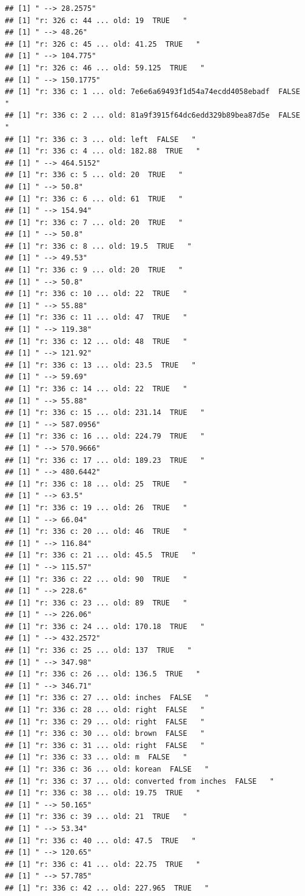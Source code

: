 \documentclass[]{article}
\begin{document}
\begin{verbatim}
## [1] " --> 28.2575"
## [1] "r: 326 c: 44 ... old: 19  TRUE   "
## [1] " --> 48.26"
## [1] "r: 326 c: 45 ... old: 41.25  TRUE   "
## [1] " --> 104.775"
## [1] "r: 326 c: 46 ... old: 59.125  TRUE   "
## [1] " --> 150.1775"
## [1] "r: 336 c: 1 ... old: 7e6e6a69493f1d54a74ecdd4058ebadf  FALSE   "
## [1] "r: 336 c: 2 ... old: 81a9f3915f64dc6edd329b89bea87d5e  FALSE   "
## [1] "r: 336 c: 3 ... old: left  FALSE   "
## [1] "r: 336 c: 4 ... old: 182.88  TRUE   "
## [1] " --> 464.5152"
## [1] "r: 336 c: 5 ... old: 20  TRUE   "
## [1] " --> 50.8"
## [1] "r: 336 c: 6 ... old: 61  TRUE   "
## [1] " --> 154.94"
## [1] "r: 336 c: 7 ... old: 20  TRUE   "
## [1] " --> 50.8"
## [1] "r: 336 c: 8 ... old: 19.5  TRUE   "
## [1] " --> 49.53"
## [1] "r: 336 c: 9 ... old: 20  TRUE   "
## [1] " --> 50.8"
## [1] "r: 336 c: 10 ... old: 22  TRUE   "
## [1] " --> 55.88"
## [1] "r: 336 c: 11 ... old: 47  TRUE   "
## [1] " --> 119.38"
## [1] "r: 336 c: 12 ... old: 48  TRUE   "
## [1] " --> 121.92"
## [1] "r: 336 c: 13 ... old: 23.5  TRUE   "
## [1] " --> 59.69"
## [1] "r: 336 c: 14 ... old: 22  TRUE   "
## [1] " --> 55.88"
## [1] "r: 336 c: 15 ... old: 231.14  TRUE   "
## [1] " --> 587.0956"
## [1] "r: 336 c: 16 ... old: 224.79  TRUE   "
## [1] " --> 570.9666"
## [1] "r: 336 c: 17 ... old: 189.23  TRUE   "
## [1] " --> 480.6442"
## [1] "r: 336 c: 18 ... old: 25  TRUE   "
## [1] " --> 63.5"
## [1] "r: 336 c: 19 ... old: 26  TRUE   "
## [1] " --> 66.04"
## [1] "r: 336 c: 20 ... old: 46  TRUE   "
## [1] " --> 116.84"
## [1] "r: 336 c: 21 ... old: 45.5  TRUE   "
## [1] " --> 115.57"
## [1] "r: 336 c: 22 ... old: 90  TRUE   "
## [1] " --> 228.6"
## [1] "r: 336 c: 23 ... old: 89  TRUE   "
## [1] " --> 226.06"
## [1] "r: 336 c: 24 ... old: 170.18  TRUE   "
## [1] " --> 432.2572"
## [1] "r: 336 c: 25 ... old: 137  TRUE   "
## [1] " --> 347.98"
## [1] "r: 336 c: 26 ... old: 136.5  TRUE   "
## [1] " --> 346.71"
## [1] "r: 336 c: 27 ... old: inches  FALSE   "
## [1] "r: 336 c: 28 ... old: right  FALSE   "
## [1] "r: 336 c: 29 ... old: right  FALSE   "
## [1] "r: 336 c: 30 ... old: brown  FALSE   "
## [1] "r: 336 c: 31 ... old: right  FALSE   "
## [1] "r: 336 c: 33 ... old: m  FALSE   "
## [1] "r: 336 c: 36 ... old: korean  FALSE   "
## [1] "r: 336 c: 37 ... old: converted from inches  FALSE   "
## [1] "r: 336 c: 38 ... old: 19.75  TRUE   "
## [1] " --> 50.165"
## [1] "r: 336 c: 39 ... old: 21  TRUE   "
## [1] " --> 53.34"
## [1] "r: 336 c: 40 ... old: 47.5  TRUE   "
## [1] " --> 120.65"
## [1] "r: 336 c: 41 ... old: 22.75  TRUE   "
## [1] " --> 57.785"
## [1] "r: 336 c: 42 ... old: 227.965  TRUE   "

\end{verbatim}
\end{document}
